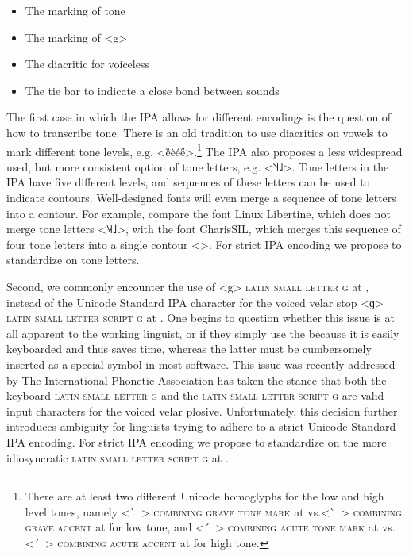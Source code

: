 \begin{itemize}
  \item The marking of tone
  \item The marking of <g>
  \item The diacritic for voiceless
  \item The tie bar to indicate a close bond between sounds
\end{itemize}

The first case in which the IPA allows for different encodings is the question
of how to transcribe tone. There is an old tradition to use diacritics on vowels
to mark different tone levels, e.g. <ȅèée̋>.\footnote{There are at least two
different Unicode homoglyphs for the low and high level tones, namely <\ ̀~>
\textsc{combining grave tone mark} at  vs.\@ <\ ̀~> \textsc{combining
grave accent} at  for low tone, and <\ ́~> \textsc{combining acute tone
mark} at  vs.\@ <\ ́~> \textsc{combining acute accent} at 
for high tone.} The IPA also proposes a less widespread used, but more
consistent option of tone letters, e.g. <˥˦˧˨˩>. Tone letters in the IPA have
five different levels, and sequences of these letters can be used to indicate
contours. Well-designed fonts will even merge a sequence of tone letters into a
contour. For example, compare the font Linux Libertine, which does not merge
tone letters <{˥˨˧˩}>, with the font CharisSIL, which
merges this sequence of four tone letters into a single contour <>.
For strict IPA encoding we propose to standardize on tone letters.

Second, we commonly encounter the use of <g> \textsc{latin small letter g} at
, instead of the Unicode Standard IPA character for the voiced velar
stop <ɡ> \textsc{latin small letter script g} at . One begins to
question whether this issue is at all apparent to the working linguist, or if
they simply use the  because it is easily keyboarded and thus saves
time, whereas the latter must be cumbersomely inserted as a special symbol in
most software. This issue was recently addressed by The International Phonetic
Association has taken the stance that both the keyboard \textsc{latin small
letter g} and the \textsc{latin small letter script g} are valid input
characters for the voiced velar plosive. Unfortunately, this decision further
introduces ambiguity for linguists trying to adhere to a strict Unicode Standard
IPA encoding. For strict IPA encoding we propose to standardize on the more 
idiosyncratic \textsc{latin small letter script g} at .


